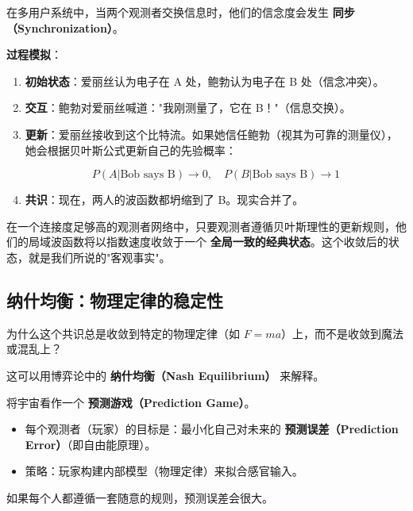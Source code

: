 在多用户系统中，当两个观测者交换信息时，他们的信念度会发生 \textbf{同步（Synchronization）}。

\textbf{过程模拟}：

\begin{enumerate}
\item \textbf{初始状态}：爱丽丝认为电子在 A 处，鲍勃认为电子在 B 处（信念冲突）。

\item \textbf{交互}：鲍勃对爱丽丝喊道："我刚测量了，它在 B！"（信息交换）。

\item \textbf{更新}：爱丽丝接收到这个比特流。如果她信任鲍勃（视其为可靠的测量仪），她会根据贝叶斯公式更新自己的先验概率：

    \begin{equation}
    P(A|\text{Bob says B}) \to 0, \quad P(B|\text{Bob says B}) \to 1
    \end{equation}

\item \textbf{共识}：现在，两人的波函数都坍缩到了 B。现实合并了。
\end{enumerate}

\begin{theorem}[共识收敛定理]
在一个连接度足够高的观测者网络中，只要观测者遵循贝叶斯理性的更新规则，他们的局域波函数将以指数速度收敛于一个 \textbf{全局一致的经典状态}。这个收敛后的状态，就是我们所说的"客观事实"。
\end{theorem}

\subsection{纳什均衡：物理定律的稳定性}

为什么这个共识总是收敛到特定的物理定律（如 $F=ma$）上，而不是收敛到魔法或混乱上？

这可以用博弈论中的 \textbf{纳什均衡（Nash Equilibrium）} 来解释。

将宇宙看作一个 \textbf{预测游戏（Prediction Game）}。

\begin{itemize}
\item 每个观测者（玩家）的目标是：最小化自己对未来的 \textbf{预测误差（Prediction Error）}（即自由能原理）。

\item 策略：玩家构建内部模型（物理定律）来拟合感官输入。
\end{itemize}

如果每个人都遵循一套随意的规则，预测误差会很大。

